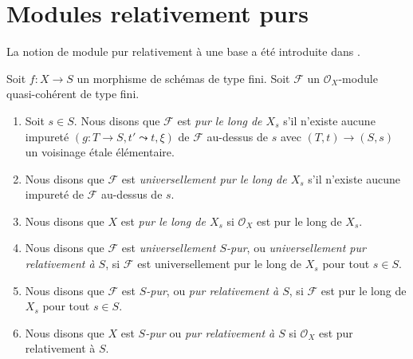 \section{Modules relativement purs}
\label{section-pure}

\noindent
La notion de module pur relativement à une base a été introduite dans \cite{GruRay}.

\begin{definition}
\label{definition-pure}
Soit $f : X \to S$ un morphisme de schémas de type fini.
Soit $\mathcal{F}$ un $\mathcal{O}_X$-module quasi-cohérent de type fini.
\begin{enumerate}
\item Soit $s \in S$. Nous disons que $\mathcal{F}$ est {\it pur le long de $X_s$}
s'il n'existe aucune impureté $(g : T \to S, t' \leadsto t, \xi)$
de $\mathcal{F}$ au-dessus de $s$ avec $(T, t) \to (S, s)$ un
voisinage \'etale élémentaire.
\item Nous disons que $\mathcal{F}$ est {\it universellement pur le long de $X_s$}
s'il n'existe aucune impureté de $\mathcal{F}$ au-dessus de $s$.
\item Nous disons que $X$ est {\it pur le long de $X_s$} si $\mathcal{O}_X$
est pur le long de $X_s$.
\item Nous disons que $\mathcal{F}$ est {\it universellement $S$-pur}, ou
{\it universellement pur relativement à $S$}, si $\mathcal{F}$ est universellement
pur le long de $X_s$ pour tout $s \in S$.
\item Nous disons que $\mathcal{F}$ est {\it $S$-pur}, ou
{\it pur relativement à $S$}, si $\mathcal{F}$ est pur le long de $X_s$
pour tout $s \in S$.
\item Nous disons que $X$ est {\it $S$-pur} ou {\it pur relativement à $S$}
si $\mathcal{O}_X$ est pur relativement à $S$.
\end{enumerate}
\end{definition}

